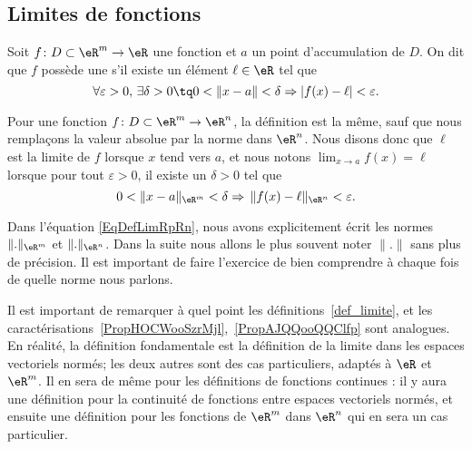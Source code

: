 \subsection{Limites de fonctions}

\begin{definition}\label{def_limite}
	Soit $f\colon D\subset\eR^m\to \eR$ une fonction et $a$ un point d'accumulation de $D$.  On dit que $f$ possède une  s'il existe un élément $\ell\in\eR$ tel que
	\begin{equation}		\label{Eq2807CondiionLimifnm}
		\forall\varepsilon>0,\,\exists\delta>0\tq 0<\| x-a \|<\delta\Rightarrow | f(x)-\ell |<\varepsilon.
	\end{equation}

	Pour une fonction $f\colon D\subset\eR^m\to \eR^n$, la définition est la même, sauf que nous remplaçons la valeur absolue par la norme dans $\eR^n$. Nous disons donc que $\ell$ est la limite de $f$ lorsque $x$ tend vers $a$, et nous notons $\lim_{x\to a} f(x)=\ell$ lorsque pour tout $\varepsilon>0$, il existe un $\delta>0$ tel que
	\begin{equation}		\label{EqDefLimRpRn}
		0<\| x-a \|_{\eR^m}<\delta\Rightarrow\,\| f(x)-\ell \|_{\eR^n}<\varepsilon.
	\end{equation}
\end{definition}

\begin{remark}
	Dans l'équation \eqref{EqDefLimRpRn}, nous avons explicitement écrit les normes $\| . \|_{\eR^m}$ et $\| . \|_{\eR^n}$. Dans la suite nous allons le plus souvent noter $\| . \|$ sans plus de précision. Il est important de faire l'exercice de bien comprendre à chaque fois de quelle norme nous parlons.
\end{remark}

\begin{remark}
	Il est important de remarquer à quel point les définitions~\ref{def_limite}, et les caractérisations~\ref{PropHOCWooSzrMjl},~\ref{PropAJQQooQQClfp} sont analogues. En réalité, la définition fondamentale est la définition de la limite dans les espaces vectoriels normés; les deux autres sont des cas particuliers, adaptés à $\eR$ et $\eR^m$. Il en sera de même pour les définitions de fonctions continues : il y aura une définition pour la continuité de fonctions entre espaces vectoriels normés, et ensuite une définition pour les fonctions de $\eR^m$ dans $\eR^n$ qui en sera un cas particulier.
\end{remark}

